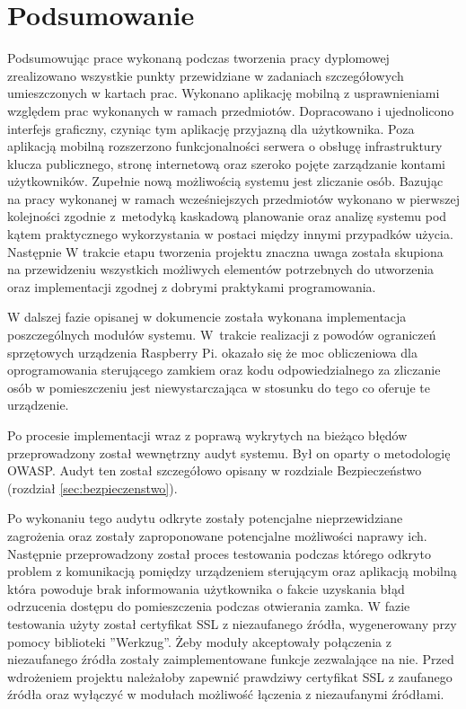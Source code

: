 \newpage
\section{Podsumowanie} \label{sec:podsumowanie}
	Podsumowując prace wykonaną podczas tworzenia pracy dyplomowej zrealizowano wszystkie punkty przewidziane w zadaniach szczegółowych umieszczonych w kartach prac. Wykonano aplikację mobilną z usprawnieniami względem prac wykonanych w ramach przedmiotów. Dopracowano i ujednolicono interfejs graficzny, czyniąc tym aplikację przyjazną dla użytkownika. Poza aplikacją mobilną rozszerzono funkcjonalności serwera o obsługę infrastruktury klucza publicznego, stronę internetową oraz szeroko pojęte zarządzanie kontami użytkowników. Zupełnie nową możliwością systemu jest zliczanie osób. \newline
	Bazując na pracy wykonanej w ramach wcześniejszych przedmiotów wykonano w pierwszej kolejności zgodnie z~metodyką kaskadową  planowanie oraz analizę systemu pod kątem praktycznego wykorzystania w postaci między innymi przypadków użycia. Następnie W trakcie etapu tworzenia projektu znaczna uwaga została skupiona na  przewidzeniu wszystkich możliwych  elementów potrzebnych do utworzenia oraz implementacji zgodnej z dobrymi praktykami programowania.
	
	W dalszej fazie opisanej w dokumencie została wykonana implementacja poszczególnych modułów systemu. W~trakcie realizacji z powodów ograniczeń sprzętowych urządzenia Raspberry Pi. okazało się że moc obliczeniowa dla oprogramowania sterującego zamkiem oraz kodu odpowiedzialnego za zliczanie osób w pomieszczeniu jest niewystarczająca w stosunku do tego co oferuje te urządzenie.
	
	Po procesie implementacji wraz z poprawą wykrytych na bieżąco błędów przeprowadzony został wewnętrzny audyt  systemu. Był on oparty o metodologię OWASP. Audyt ten został szczegółowo opisany w rozdziale Bezpieczeństwo (rozdział \ref{sec:bezpieczenstwo}).
	
	Po wykonaniu tego audytu odkryte zostały potencjalne nieprzewidziane zagrożenia oraz zostały zaproponowane potencjalne możliwości naprawy ich. Następnie przeprowadzony został proces testowania podczas którego odkryto problem z komunikacją pomiędzy urządzeniem sterującym oraz aplikacją mobilną która powoduje brak informowania użytkownika o fakcie uzyskania błąd odrzucenia dostępu do pomieszczenia podczas otwierania zamka. W fazie testowania użyty został certyfikat SSL z niezaufanego źródła, wygenerowany przy pomocy biblioteki ''Werkzug''. Żeby moduły akceptowały połączenia z niezaufanego źródła zostały zaimplementowane funkcje zezwalające na nie. Przed wdrożeniem projektu należałoby zapewnić prawdziwy certyfikat SSL z zaufanego źródła oraz wyłączyć w modułach możliwość łączenia z niezaufanymi źródłami.               

